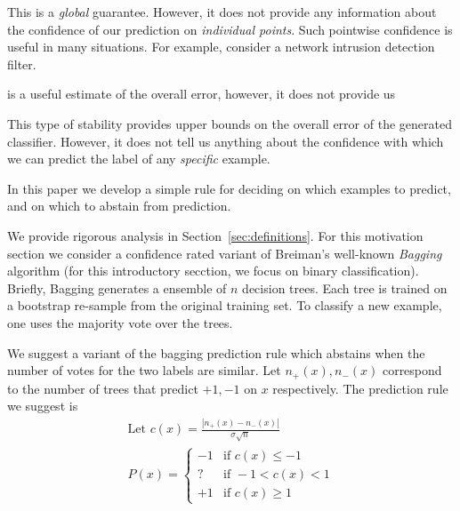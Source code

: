 \documentclass{article}
\begin{document}
This is a {\em global}
guarantee. However, it does not provide any information about the
confidence of our prediction on {\em individual points}. Such
pointwise confidence is useful in many situations. For example,
consider a network intrusion detection filter.  

is a useful estimate of the
overall error, however, it does not provide us 

This type of stability provides upper bounds on the overall error of the
generated classifier. However, it does not tell us anything about the
confidence with which we can predict the label of any {\em specific} example.

In this paper we develop a simple rule for deciding on which examples
to predict, and on which to abstain from prediction.

We provide rigorous analysis in Section~\ref{sec:definitions}. For
this motivation section we consider a confidence rated variant of Breiman's
well-known {\em Bagging}~\cite{breiman1996bagging} algorithm (for this introductory secction, we
focus on binary classification). Briefly, Bagging generates
a ensemble of $n$ decision trees. Each tree is trained on a bootstrap
re-sample from the original training set. To classify a new
example, one uses the majority vote over the trees.

\newcommand{\sign}{\mbox{sign}}
We suggest a variant of the bagging prediction rule which abstains
when the number of votes for the two labels are similar.  Let
$n_+(x),n_-(x)$ correspond to the number of trees that predict $+1,-1$
on $x$ respectively. 
The prediction rule we suggest is
\begin{eqnarray} \label{eqn:baggingWithAbstention}
  \mbox{Let }
  c(x)=\frac{|n_+(x)-n_-(x)|}{\sigma \sqrt{n}}
  \\
  P(x) =
  \begin{cases}
    -1 & \mbox{if } c(x) \leq -1 \\
    ? & \mbox{if }  -1 < c(x) < 1\\
    +1 & \mbox{if } c(x) \geq  1 
  \end{cases}
\end{eqnarray}
\end{document}
